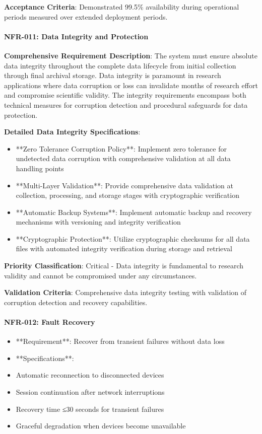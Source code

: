 \documentclass[11pt,a4paper]{report}
\begin{document}
\textbf{Acceptance Criteria}: Demonstrated 99.5\% availability during operational periods measured over extended deployment
periods.

\paragraph{NFR-011: Data Integrity and Protection}

\textbf{Comprehensive Requirement Description}: The system must ensure absolute data integrity throughout the complete data
lifecycle from initial collection through final archival storage. Data integrity is paramount in research applications
where data corruption or loss can invalidate months of research effort and compromise scientific validity. The integrity
requirements encompass both technical measures for corruption detection and procedural safeguards for data protection.

\textbf{Detailed Data Integrity Specifications}:

\begin{itemize}
\item **Zero Tolerance Corruption Policy**: Implement zero tolerance for undetected data corruption with comprehensive
  validation at all data handling points
\item **Multi-Layer Validation**: Provide comprehensive data validation at collection, processing, and storage stages with
  cryptographic verification
\item **Automatic Backup Systems**: Implement automatic backup and recovery mechanisms with versioning and integrity
  verification
\item **Cryptographic Protection**: Utilize cryptographic checksums for all data files with automated integrity verification
  during storage and retrieval

\end{itemize}
\textbf{Priority Classification}: Critical - Data integrity is fundamental to research validity and cannot be compromised
under any circumstances.

\textbf{Validation Criteria}: Comprehensive data integrity testing with validation of corruption detection and recovery
capabilities.

\paragraph{NFR-012: Fault Recovery}

\begin{itemize}
\item **Requirement**: Recover from transient failures without data loss
\item **Specifications**:
\item Automatic reconnection to disconnected devices
\item Session continuation after network interruptions
\item Recovery time ≤30 seconds for transient failures
\item Graceful degradation when devices become unavailable

\end{itemize}
\end{document}
